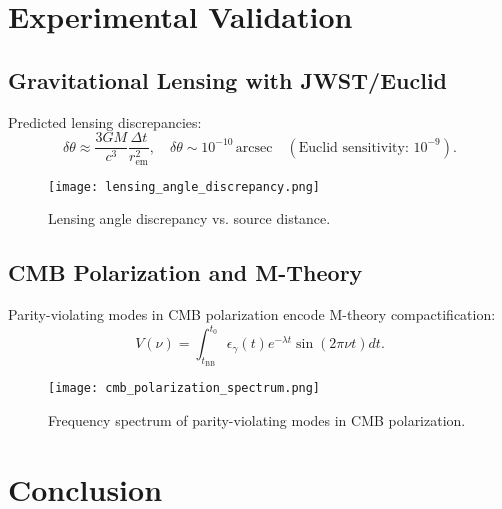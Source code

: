 \documentclass[12pt, a4paper]{article}
\begin{document}
\section{Experimental Validation}

\subsection{Gravitational Lensing with JWST/Euclid}

Predicted lensing discrepancies:
\begin{equation}
\delta \theta \approx \frac{3GM}{c^3} \frac{\Delta t}{r_{\text{em}}^2}, \quad \delta \theta \sim 10^{-10} \, \text{arcsec} \quad (\text{Euclid sensitivity: } 10^{-9}). \label{eq:lensing}
\end{equation}

\begin{figure}[h]
\centering
\texttt{[image: lensing\_angle\_discrepancy.png]}
\caption{Lensing angle discrepancy vs. source distance.}
\label{fig:lensing}
\end{figure}

\subsection{CMB Polarization and M-Theory}

Parity-violating modes in CMB polarization encode M-theory compactification:
\begin{equation}
V(\nu) = \int_{t_{\text{BB}}}^{t_0} \epsilon_{\gamma}(t) e^{-\lambda t} \sin(2\pi \nu t) dt. \label{eq:parity}
\end{equation}

\begin{figure}[h]
\centering
\texttt{[image: cmb\_polarization\_spectrum.png]}
\caption{Frequency spectrum of parity-violating modes in CMB polarization.}
\label{fig:polarization}
\end{figure}

\section{Conclusion}
\end{document}
